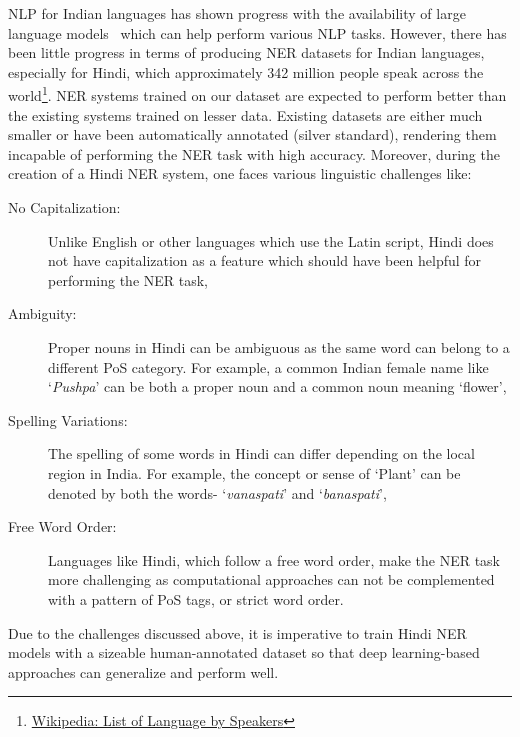 \documentclass[10pt, a4paper]{article}
\begin{document}
NLP for Indian languages has shown progress with the availability of large language models~\cite{kumar-etal-2020-passage,kakwani2020inlpsuite,khanuja2021muril} which can help perform various NLP tasks. However, there has been little progress in terms of producing NER datasets for Indian languages, especially for Hindi, which approximately 342 million people speak across the world\footnote{\href{https://en.wikipedia.org/wiki/List_of_languages_by_total_number_of_speakers}{Wikipedia: List of Language by Speakers}}. NER systems trained on our dataset are expected to perform better than the existing systems trained on lesser data. Existing datasets are either much smaller or have been automatically annotated (silver standard), rendering them incapable of performing the NER task with high accuracy. Moreover, during the creation of a Hindi NER system, one faces various linguistic challenges like:
\begin{description}
\item[No Capitalization:] Unlike English or other languages which use the Latin script, Hindi does not have capitalization as a feature which should have been helpful for performing the NER task,
\item[Ambiguity:] Proper nouns in Hindi can be ambiguous as the same word can belong to a different PoS category. For example, a common Indian female name like `\textit{Pushpa}' can be both a proper noun and a common noun meaning `flower',
\item[Spelling Variations:] The spelling of some words in Hindi can differ depending on the local region in India. For example, the concept or sense of `Plant' can be denoted by both the words- `\textit{vanaspati}' and `\textit{banaspati}', 
\item[Free Word Order:] Languages like Hindi, which follow a free word order, make the NER task more challenging as computational approaches can not be complemented with a pattern of PoS tags, or strict word order.
\end{description}

Due to the challenges discussed above, it is imperative to train Hindi NER models with a sizeable human-annotated dataset so that deep learning-based approaches can generalize and perform well. 
\end{document}
